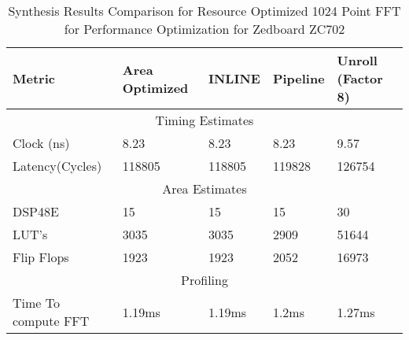 \begin{table}[H]
\centering
\caption{Synthesis Results Comparison for Resource Optimized 1024 Point FFT for Performance Optimization for Zedboard ZC702}
\label{Table 4.3}
\begin{tabular}{||m{4cm}|m{2.5cm}|m{2.5cm}|m{2.5cm}|m{2.5cm}||}
\hline
Metric & Area Optimized & INLINE & Pipeline & Unroll (Factor 8)\\
\hline
\multicolumn{5}{||c||}{Timing Estimates}\\
\hline
Clock (ns)&8.23 &8.23&8.23& 9.57\\
\hline
Latency(Cycles) &118805 & 118805 &119828 &126754\\
\hline
\multicolumn{5}{||c||}{Area Estimates}\\
\hline
DSP48E & 15& 15 &15 & 30 \\
\hline
LUT's & 3035 & 3035 &2909 &51644\\
\hline
Flip Flops & 1923 & 1923 & 2052 &16973\\
\hline	
\multicolumn{5}{||c||}{Profiling}\\
\hline
Time To compute FFT &1.19ms&1.19ms&1.2ms&1.27ms\\
\hline
\end{tabular}

\end{table}